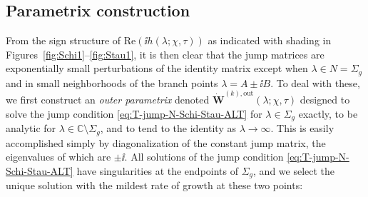 \subsection{Parametrix construction}
\label{sec:Airy-parametrix}
From the sign structure of $\mathrm{Re}(\ii h(\lambda;\chi,\tau))$ as indicated with shading in Figures~\ref{fig:Schi1}--\ref{fig:Stau1}, it is then clear that the jump matrices are exponentially small perturbations of the identity matrix except when $\lambda\in N=\Sigma_g$ and in small neighborhoods of the branch points $\lambda=A\pm \ii B$.  To deal with these, we first construct an \emph{outer parametrix} denoted 
$\dot{\mathbf{W}}^{(k),\mathrm{out}}(\lambda;\chi,\tau)$
designed to solve the jump condition %
\eqref{eq:T-jump-N-Schi-Stau-ALT} for $\lambda\in\Sigma_g$ exactly, to be analytic for $\lambda\in\mathbb{C}\setminus\Sigma_g$, and to tend to the identity as $\lambda\to\infty$.  This is easily accomplished simply by diagonalization of the constant jump matrix, the eigenvalues of which are $\pm \ii$.  All solutions of the jump condition 
\eqref{eq:T-jump-N-Schi-Stau-ALT}
have singularities at the endpoints of $\Sigma_g$, and we select the unique solution with the mildest rate of growth at these two points:
